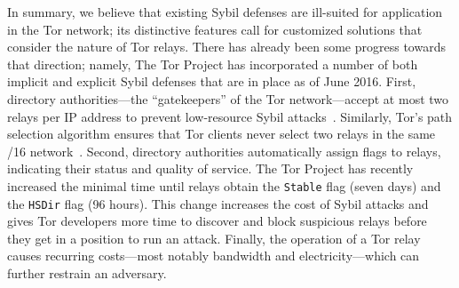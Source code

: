 In summary, we believe that existing Sybil defenses are ill-suited for
application in the Tor network; its distinctive features call for customized
solutions that consider the nature of Tor relays.  There has already been some
progress towards that direction; namely, The Tor Project has incorporated a
number of both implicit and explicit Sybil defenses that are in place as of
June 2016.  First, directory authorities---the ``gatekeepers'' of the Tor
network---accept at most two relays per IP address to prevent low-resource
Sybil attacks~\cite{Bauer2007a,Bauer2007b}.  Similarly, Tor's path selection
algorithm ensures that Tor clients never select two relays in the same /16
network~\cite{path-spec}.  Second, directory authorities automatically assign
flags to relays, indicating their status and quality of service.  The Tor
Project has recently increased the minimal time until relays obtain the
\texttt{Stable} flag (seven days) and the \texttt{HSDir} flag (96 hours).  This
change increases the cost of Sybil attacks and gives Tor developers more time
to discover and block suspicious relays before they get in a position to run an
attack.  Finally, the operation of a Tor relay causes recurring costs---most
notably bandwidth and electricity---which can further restrain an adversary.
